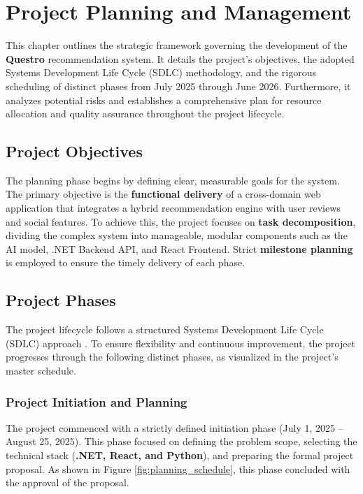 \chapter{Project Planning and Management}
\label{chap:project_planning}

This chapter outlines the strategic framework governing the development of the \textbf{Questro} recommendation system. It details the project's objectives, the adopted Systems Development Life Cycle (SDLC) methodology, and the rigorous scheduling of distinct phases from July 2025 through June 2026. Furthermore, it analyzes potential risks and establishes a comprehensive plan for resource allocation and quality assurance throughout the project lifecycle.

\section{Project Objectives}
\label{sec:project_objectives}
The planning phase begins by defining clear, measurable goals for the system. The primary objective is the \textbf{functional delivery} of a cross-domain web application that integrates a hybrid recommendation engine with user reviews and social features. To achieve this, the project focuses on \textbf{task decomposition}, dividing the complex system into manageable, modular components such as the AI model, .NET Backend API, and React Frontend. Strict \textbf{milestone planning} is employed to ensure the timely delivery of each phase.

\section{Project Phases}
\label{sec:project_phases}
The project lifecycle follows a structured Systems Development Life Cycle (SDLC) approach \cite{sdlc_ref}. To ensure flexibility and continuous improvement, the project progresses through the following distinct phases, as visualized in the project's master schedule.

\subsection{Project Initiation and Planning}
\label{subsec:initiation}
The project commenced with a strictly defined initiation phase (July 1, 2025 – August 25, 2025). This phase focused on defining the problem scope, selecting the technical stack (\textbf{.NET, React, and Python}), and preparing the formal project proposal. As shown in Figure \ref{fig:planning_schedule}, this phase concluded with the approval of the proposal.

